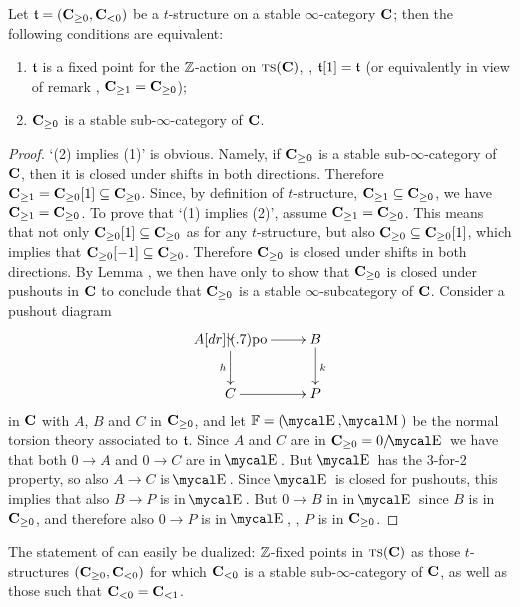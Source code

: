 \begin{proposition}\label{stableare}
Let $\mathfrak{t}=(\textbf{C}_{\geq 0},\textbf{C}_{<0})$ be a $t$\hyp{}structure on a stable $\infty$\hyp{}category $\textbf{C}$; then the following conditions are equivalent:
\begin{enumerate}
\item $\mathfrak{t}$ is a fixed point for the $\mathbb{Z} $\hyp{}action on $\text{\scshape ts}(\textbf{C})$, \ie, $\mathfrak{t}[1]=\mathfrak{t}$ (or equivalently in view of remark , $\textbf{C}_{\geq 1}= \textbf{C}_{\geq 0}$);
\item $\textbf{C}_{\geq 0}$ is a stable sub\hyp{}$\infty$\hyp{}category of $\textbf{C}$.
\end{enumerate}
\end{proposition}
\begin{proof}
`(2) implies (1)' is obvious. Namely, if  $\textbf{C}_{\ge 0}$ is a stable sub\hyp{}$\infty$\hyp{}category of $\textbf{C}$, then it is closed under shifts in both directions. Therefore $\textbf{C}_{\ge 1}=\textbf{C}_{\geq 0}[1]\subseteq \textbf{C}_{\ge 0}$. Since, by definition of $t$\hyp{}structure, $\textbf{C}_{\geq 1}\subseteq \textbf{C}_{\geq 0}$, we have $\textbf{C}_{\geq 1}= \textbf{C}_{\geq 0}$. To prove that `(1) implies (2)', assume $\textbf{C}_{\geq 1}=\textbf{C}_{\geq 0}$. This means that not only $\textbf{C}_{\geq 0}[1]\subseteq \textbf{C}_{\geq 0}$ as for any $t$\hyp{}structure, but also $\textbf{C}_{\geq 0}\subseteq \textbf{C}_{\geq 0}[1]$, which implies that $\textbf{C}_{\geq 0}[-1]\subseteq \textbf{C}_{\geq 0}$. Therefore $\textbf{C}_{\geq 0}$ is closed under shifts in both directions. By Lemma ,  we then have only to show that $\textbf{C}_{\geq 0}$ is closed under pushouts in $\textbf{C}$ to conclude that $\textbf{C}_{\geq 0}$ is a stable $\infty$\hyp{}subcategory of $\textbf{C}$. Consider a pushout diagram
\[
\xymatrix{
 A \ar[r]\ar[d]_h \po & B\ar[d]^k \\
 C \ar[r] & P
}
\]
in $\textbf{C}$ with $A$, $B$ and $C$ in $\textbf{C}_{\geq 0}$, and let $\fF=(\EE,\MM)$ be the normal torsion theory associated to $\mathfrak{t}$. Since $A$ and $C$ are in $\CC_{\geq 0} = 0/\EE$ we have that both $0\to A$ and $0\to C$ are in $\EE$. But $\EE$ has the 3\hyp{}for\hyp{}2 property, so also $A\to C$ is $\EE$. Since $\EE$ is closed for pushouts, this implies that also $B\to P$ is in $\EE$. But $0\to B$ in in $\EE$ since $B$ is in $\textbf{C}_{\geq 0}$, and therefore also $0\to P$ is in $\EE$, \ie, $P$ is in $\textbf{C}_{\geq 0}$.
\end{proof}
\begin{remark}\label{dual.of.the.above}
The statement of \aprop {} can easily be dualized: $\mathbb{Z} $\hyp{}fixed points in $\text{\scshape ts}(\textbf{C})$ as those $t$\hyp{}structures $(\textbf{C}_{\geq 0},\textbf{C}_{<0})$ for which $\textbf{C}_{<0}$ is a stable sub\hyp{}$\infty$\hyp{}category of $\textbf{C}$, as well as those such that $\textbf{C}_{<0} = \textbf{C}_{<1}$.
\end{remark}
